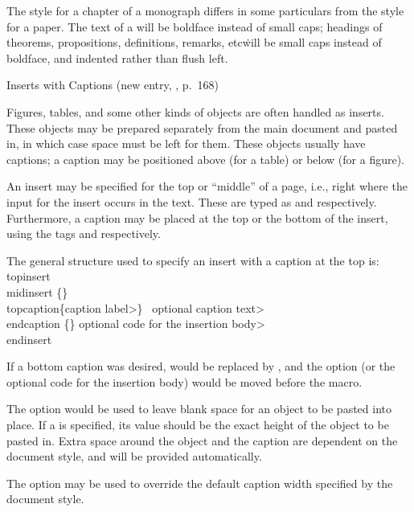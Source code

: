 The style for a chapter of a monograph differs in some particulars from the
style for a paper.  The text of a  will be boldface instead of
small caps; headings of theorems, propositions, definitions, remarks, etc\.
will be small caps instead of boldface, and indented rather than flush 
left.


\subhead Inserts with Captions {\rm (new entry, \Joy, p.~168)}
\endsubhead

Figures, tables, and some other kinds of objects are often handled as
inserts.  These objects may be prepared separately from the main document
and pasted in, in which case space must be left for them.
These objects usually have captions; a caption may be positioned above (for
a table) or below (for a figure).

An insert may be specified for the top or ``middle'' of a page, i.e.,
right where the input for the insert occurs in the text.  These are
typed as  and  respectively.
Furthermore, a caption may be placed at the top or the bottom of the insert,
using the tags  and  respectively.

The general structure used to specify an insert with a caption at the top is:
\beginexample{}
\\topinsert{}\quad \\midinsert
{}\{\Dimen\}
\\topcaption\{\<caption label>\}
\ \<optional caption text>
\\endcaption
{}\{\Dimen\}\quad%
  \<optional code for the insertion body>
\\endinsert
\endexample

If a bottom caption was desired,  would be replaced by
, and
the  option (or the
optional code for the insertion body) would be moved before the
 macro.

The  option would be used to leave blank space for an
object to be pasted into place.
If a \Dimen{} is specified, its value should be the exact height of the
object to be pasted in.  Extra space around the object and the caption
are dependent on the document style, and will be provided automatically.

The  option may be used to override the default
caption width specified by the document style.

